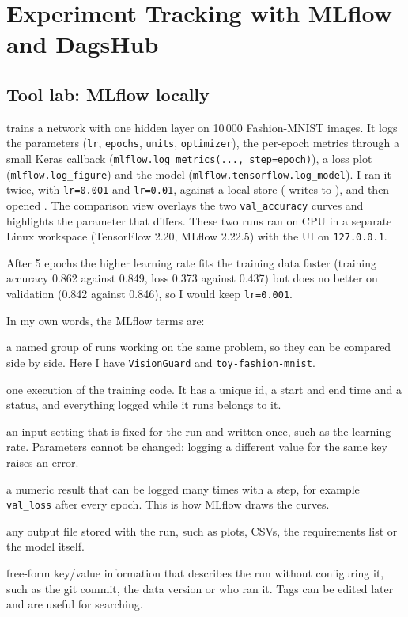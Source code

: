 \chapter{Experiment Tracking with MLflow and DagsHub}\label{ch:tracking}

\section{Tool lab: MLflow locally}
 trains a network with one hidden layer on 10\,000 Fashion-MNIST images.
It logs the parameters (\texttt{lr}, \texttt{epochs}, \texttt{units}, \texttt{optimizer}), the
per-epoch metrics through a small Keras callback (\texttt{mlflow.log\_metrics(..., step=epoch)}),
a loss plot (\texttt{mlflow.log\_figure}) and the model (\texttt{mlflow.tensorflow.log\_model}). I
ran it twice, with \texttt{lr=0.001} and \texttt{lr=0.01}, against a local store (
writes to ), and then opened .
The comparison view overlays the two \texttt{val\_accuracy} curves and highlights the parameter
that differs. These two runs ran on CPU in a separate Linux workspace (TensorFlow 2.20, MLflow
2.22.5) with the UI on \texttt{127.0.0.1}.

After 5 epochs the higher learning rate fits the training data faster (training accuracy 0.862
against 0.849, loss 0.373 against 0.437) but does no better on validation (0.842 against 0.846),
so I would keep \texttt{lr=0.001}.


In my own words, the MLflow terms are:
\begin{description}[leftmargin=2.2cm,style=nextline]
\item[Experiment] a named group of runs working on the same problem, so they can be compared side
by side. Here I have \texttt{VisionGuard} and \texttt{toy-fashion-mnist}.
\item[Run] one execution of the training code. It has a unique id, a start and end time and a
status, and everything logged while it runs belongs to it.
\item[Parameter] an input setting that is fixed for the run and written once, such as the learning
rate. Parameters cannot be changed: logging a different value for the same key raises an error.
\item[Metric] a numeric result that can be logged many times with a step, for example
\texttt{val\_loss} after every epoch. This is how MLflow draws the curves.
\item[Artifact] any output file stored with the run, such as plots, CSVs, the requirements list or
the model itself.
\item[Tag] free-form key/value information that describes the run without configuring it, such as
the git commit, the data version or who ran it. Tags can be edited later and are useful for
searching.
\end{description}

